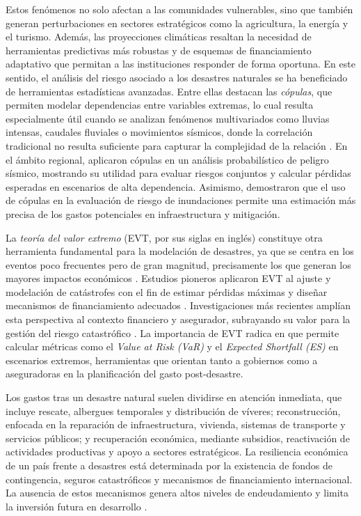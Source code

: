 \documentclass[12pt, a4paper]{article}
\begin{document}
Estos fenómenos no solo afectan a las comunidades vulnerables, sino que también generan perturbaciones en sectores estratégicos como la agricultura, la energía y el turismo. Además, las proyecciones climáticas resaltan la necesidad de herramientas predictivas más robustas y de esquemas de financiamiento adaptativo que permitan a las instituciones responder de forma oportuna. En este sentido, el análisis del riesgo asociado a los desastres naturales se ha beneficiado de herramientas estadísticas avanzadas. Entre ellas destacan las \textit{cópulas}, que permiten modelar dependencias entre variables extremas, lo cual resulta especialmente útil cuando se analizan fenómenos multivariados como lluvias intensas, caudales fluviales o movimientos sísmicos, donde la correlación tradicional no resulta suficiente para capturar la complejidad de la relación \cite{patton2012review, krupskii2013factor}. En el ámbito regional,  aplicaron cópulas en un análisis probabilístico de peligro sísmico, mostrando su utilidad para evaluar riesgos conjuntos y calcular pérdidas esperadas en escenarios de alta dependencia. Asimismo,  demostraron que el uso de cópulas en la evaluación de riesgo de inundaciones permite una estimación más precisa de los gastos potenciales en infraestructura y mitigación.

La \textit{teoría del valor extremo} (EVT, por sus siglas en inglés) constituye otra herramienta fundamental para la modelación de desastres, ya que se centra en los eventos poco frecuentes pero de gran magnitud, precisamente los que generan los mayores impactos económicos \cite{Siddiqui2022}. Estudios pioneros aplicaron EVT al ajuste y modelación de catástrofes con el fin de estimar pérdidas máximas y diseñar mecanismos de financiamiento adecuados \cite{PerezGarcia2004}. Investigaciones más recientes amplían esta perspectiva al contexto financiero y asegurador, subrayando su valor para la gestión del riesgo catastrófico \cite{DelfinerGutierrez2025}. La importancia de EVT radica en que permite calcular métricas como el \textit{Value at Risk (VaR)} y el \textit{Expected Shortfall (ES)} en escenarios extremos, herramientas que orientan tanto a gobiernos como a aseguradoras en la planificación del gasto post-desastre.

Los gastos tras un desastre natural suelen dividirse en atención inmediata, que incluye rescate, albergues temporales y distribución de víveres; reconstrucción, enfocada en la reparación de infraestructura, vivienda, sistemas de transporte y servicios públicos; y recuperación económica, mediante subsidios, reactivación de actividades productivas y apoyo a sectores estratégicos. La resiliencia económica de un país frente a desastres está determinada por la existencia de fondos de contingencia, seguros catastróficos y mecanismos de financiamiento internacional. La ausencia de estos mecanismos genera altos niveles de endeudamiento y limita la inversión futura en desarrollo \cite{CentenoMorales2017,OrozcoMontoya2022}.
\end{document}
